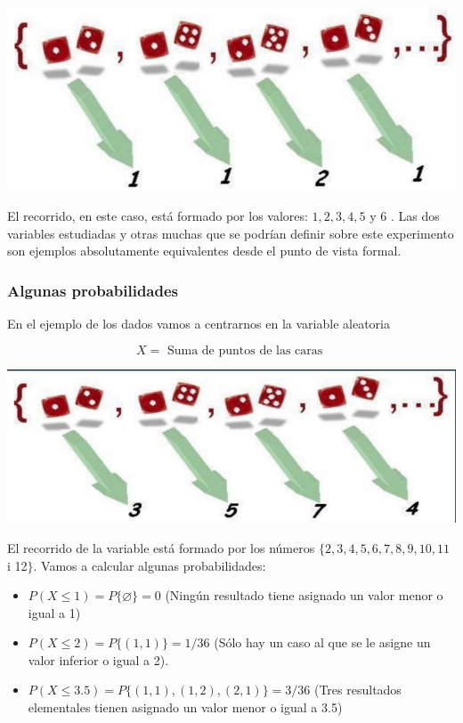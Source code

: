 \documentclass[
]{article}
\providecommand{\tightlist}{%
  \setlength{\itemsep}{0pt}\setlength{\parskip}{0pt}}
\begin{document}
\includegraphics{images/clipboard-3898377838.png}

El recorrido, en este caso, está formado por los valores: \(1,2,3,4,5\) y
6 . Las dos variables estudiadas y otras muchas que se podrían definir
sobre este experimento son ejemplos absolutamente equivalentes desde el
punto de vista formal.

\subsubsection{Algunas probabilidades}\label{algunas-probabilidades}

En el ejemplo de los dados vamos a centrarnos en la variable aleatoria

\[
X=\text { Suma de puntos de las caras }
\]

\includegraphics{images/clipboard-1018442669.png}

El recorrido de la variable está formado por los números
\(\{2,3,4,5,6,7,8,9,10,11\) i 12\(\}\). Vamos a calcular algunas
probabilidades:

\begin{itemize}
\tightlist
\item
  \(P(X \leq 1)=P\{\varnothing\}=0\) (Ningún resultado tiene asignado un
  valor menor o igual a 1)
\item
  \(P(X \leq 2)=P\{(1,1)\}=1/36\) (Sólo hay un caso al que se le asigne
  un valor inferior o igual a 2).
\item
  \(P(X \leq 3.5)=P\{(1,1), (1,2), (2,1)\}=3/36\) (Tres resultados
  elementales tienen asignado un valor menor o igual a 3.5)
\end{itemize}
\end{document}
